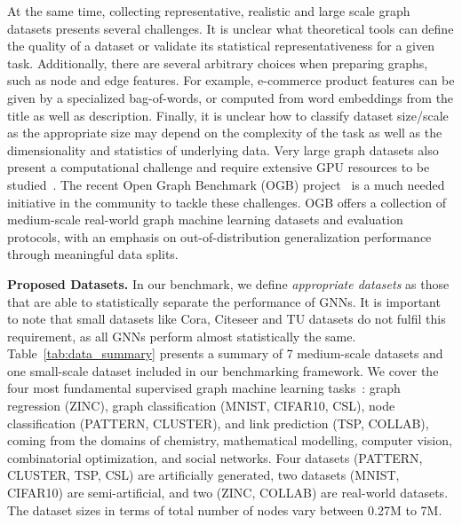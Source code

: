 \documentclass{article}
\begin{document}
At the same time, collecting representative, realistic and large scale graph datasets presents several challenges.
It is unclear what theoretical tools can define the quality of a dataset or validate its statistical representativeness for a given task.
Additionally, there are several arbitrary choices when preparing graphs, such as node and edge features. For example, e-commerce product features can be given by a specialized bag-of-words, or computed from word embeddings from the title as well as description. Finally, it is unclear how to classify dataset size/scale as
the appropriate size may depend on the complexity of the task as well as the dimensionality and statistics of underlying data.
Very large graph datasets also present a computational challenge and require extensive GPU resources to be studied~\cite{chiang2019cluster,rossi2020sign}. 
The recent Open Graph Benchmark (OGB) project~\cite{hu2020ogb} is a much needed initiative in the community to tackle these challenges. 
OGB offers a collection of medium-scale real-world graph machine learning datasets and evaluation protocols, with an emphasis on out-of-distribution generalization performance through meaningful data splits.







{\bf Proposed Datasets. } In our benchmark, we define {\it appropriate datasets} as those that are able to statistically separate the performance of GNNs. 
It is important to note that small datasets like Cora, Citeseer and TU datasets do not fulfil this requirement, as all GNNs perform almost statistically the same. Table~\ref{tab:data_summary} presents a summary of 7 medium-scale datasets and one small-scale dataset included in our benchmarking framework.
We cover the four most fundamental supervised graph machine learning tasks~\cite{chami2020machine}: graph regression (ZINC), graph classification (MNIST, CIFAR10, CSL), node classification (PATTERN, CLUSTER), and link prediction (TSP, COLLAB), coming from the domains of chemistry, mathematical modelling, computer vision, combinatorial optimization, and social networks. 
Four datasets (PATTERN, CLUSTER, TSP, CSL) are artificially generated, two datasets (MNIST, CIFAR10) are semi-artificial, and two (ZINC, COLLAB) are real-world datasets.
The dataset sizes in terms of total number of nodes vary between 0.27M to 7M.
\end{document}
